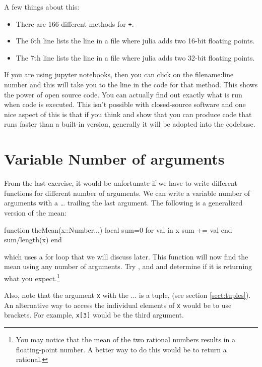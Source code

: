 A few things about this:
\begin{itemize}
\item There are 166 different methods for \verb!+!. 
\item The 6th line lists the line in a file where julia adds two 16-bit floating points.
\item The 7th line lists the line in a file where julia adds two 32-bit floating points.
\end{itemize}

If you are using jupyter notebooks, then you can click on the filename:line number and this will take you to the line in the code for that method.  This shows the power of open source code.  You can actually find out exactly what is run when code is executed.  This isn't possible with closed-source software and one nice aspect of this is that if you think and show that you can produce code that runs faster than a built-in version, generally it will be adopted into the codebase. 


\section{Variable Number of arguments} \label{sect:varargs}

From the last exercise, it would be unfortunate if we have to write
different functions for different number of arguments. We can write a
variable number of arguments with a \ldots{} trailing the last argument.
The following is a generalized version of the mean:

\begin{jlblock}[functions]
function theMean(x::Number...)
  local sum=0
  for val in x
    sum += val
  end
  sum/length(x)
end
\end{jlblock}
%
which uses a for loop that we will discuss later. This function will now
find the mean using any number of arguments. Try
,  and   and
determine if it is returning what you expect.\footnote{You may notice that the mean of the two rational numbers results in a floating-point number.  A better way to do this would be to return a rational.}

Also, note that the argument \verb!x! with the ... is a tuple, (see section \ref{sect:tuples}).  An alternative way to access the individual elements of \texttt{x} would be to use brackets.  For example, \verb!x[3]! would be the third argument.  


